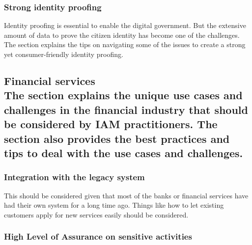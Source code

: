 \hypertarget{strong-identity-proofing}{%
\subsubsection{Strong identity proofing}\label{strong-identity-proofing}}

Identity proofing is essential to enable the digital government. But the
extensive amount of data to prove the citizen identity has become one of
the challenges. The section explains the tips on navigating some of the
issues to create a strong yet consumer-friendly identity proofing.

\hypertarget{financial-services-the-section-explains-the-unique-use-cases-and-challenges-in-the-financial-industry-that-should-be-considered-by-iam-practitioners.-the-section-also-provides-the-best-practices-and-tips-to-deal-with-the-use-cases-and-challenges.}{%
\subsection{\texorpdfstring{Financial services\\
The section explains the unique use cases and challenges in the
financial industry that should be considered by IAM practitioners. The
section also provides the best practices and tips to deal with the use
cases and
challenges.}{Financial services The section explains the unique use cases and challenges in the financial industry that should be considered by IAM practitioners. The section also provides the best practices and tips to deal with the use cases and challenges.}}\label{financial-services-the-section-explains-the-unique-use-cases-and-challenges-in-the-financial-industry-that-should-be-considered-by-iam-practitioners.-the-section-also-provides-the-best-practices-and-tips-to-deal-with-the-use-cases-and-challenges.}}

\hypertarget{integration-with-the-legacy-system}{%
\subsubsection{Integration with the legacy
system}\label{integration-with-the-legacy-system}}

This should be considered given that most of the banks or financial
services have had their own system for a long time ago. Things like how
to let existing customers apply for new services easily should be
considered.

\hypertarget{high-level-of-assurance-on-sensitive-activities}{%
\subsubsection{High Level of Assurance on sensitive
activities}\label{high-level-of-assurance-on-sensitive-activities}}

